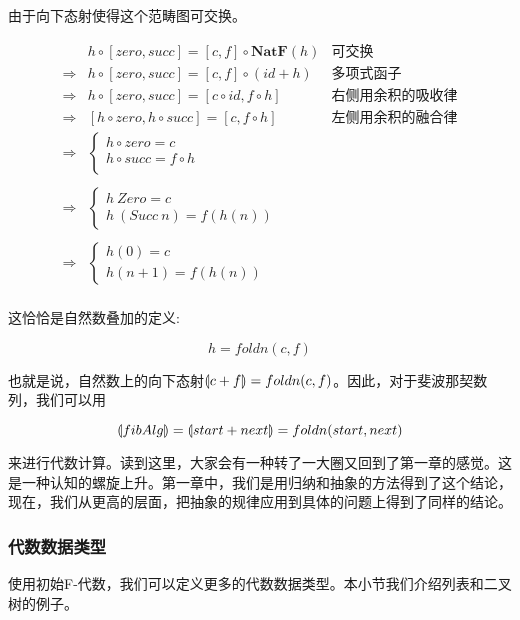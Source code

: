 \documentclass{article}
\begin{document}
由于向下态射使得这个范畴图可交换。

\[
\begin{array}{rll}
            & h \circ [zero, succ] = [c, f] \circ \mathbf{NatF}(h) & \text{可交换} \\
\Rightarrow & h \circ [zero, succ] = [c, f] \circ (id + h) & \text{多项式函子} \\
\Rightarrow & h \circ [zero, succ] = [c \circ id, f \circ h] & \text{右侧用余积的吸收律} \\
\Rightarrow & [h \circ zero, h \circ succ] = [c, f \circ h] & \text{左侧用余积的融合律} \\
\Rightarrow &
  \begin{cases}
    h \circ zero = c \\
    h \circ succ = f \circ h \\
  \end{cases} & \\
\\
\Rightarrow &
  \begin{cases}
    h\ Zero = c \\
    h\ (Succ\ n) = f(h(n))
  \end{cases} & \\
\\
\Rightarrow &
  \begin{cases}
    h(0) = c \\
    h(n + 1) = f(h(n))
  \end{cases} & \\
\end{array}
\]

这恰恰是自然数叠加的定义:

\[
  h = foldn(c, f)
\]

也就是说，自然数上的向下态射$\llparenthesis c + f \rrparenthesis = foldn(c, f)$。因此，对于斐波那契数列，我们可以用

\[
\llparenthesis fibAlg \rrparenthesis = \llparenthesis start + next \rrparenthesis = foldn(start, next)
\]

来进行代数计算。读到这里，大家会有一种转了一大圈又回到了第一章的感觉。这是一种认知的螺旋上升。第一章中，我们是用归纳和抽象的方法得到了这个结论，现在，我们从更高的层面，把抽象的规律应用到具体的问题上得到了同样的结论。

\subsubsection{代数数据类型}

使用初始F-代数，我们可以定义更多的代数数据类型。本小节我们介绍列表和二叉树的例子。
\end{document}
